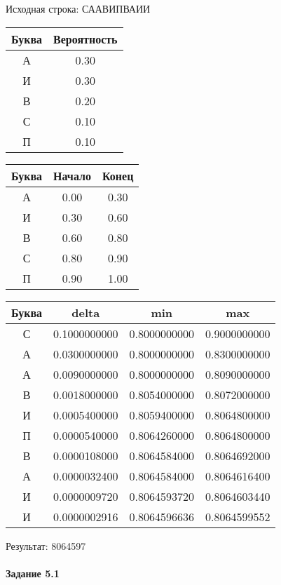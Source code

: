 \documentclass[a4paper, 12pt]{article}
\begin{document}
Исходная строка: СААВИПВАИИ\
\begin{center}
 \begin{tabular}{ |c|c| } 
  \hline
     Буква & Вероятность \\ \hline
А & 0.30\\\hline
И & 0.30\\\hline
В & 0.20\\\hline
С & 0.10\\\hline
П & 0.10
\\ \hline \end{tabular}
\end{center}
\begin{center}
 \begin{tabular}{ |c|c|c| } 
  \hline
     Буква & Начало & Конец \\ \hline
А & 0.00 & 0.30\\\hline
И & 0.30 & 0.60\\\hline
В & 0.60 & 0.80\\\hline
С & 0.80 & 0.90\\\hline
П & 0.90 & 1.00
\\ \hline \end{tabular}
\end{center}
\begin{center}
 \begin{tabular}{ |c|c|c|c| } 
  \hline
     Буква & delta & min & max \\ \hline
С & 0.1000000000 & 0.8000000000 & 0.9000000000\\\hline
А & 0.0300000000 & 0.8000000000 & 0.8300000000\\\hline
А & 0.0090000000 & 0.8000000000 & 0.8090000000\\\hline
В & 0.0018000000 & 0.8054000000 & 0.8072000000\\\hline
И & 0.0005400000 & 0.8059400000 & 0.8064800000\\\hline
П & 0.0000540000 & 0.8064260000 & 0.8064800000\\\hline
В & 0.0000108000 & 0.8064584000 & 0.8064692000\\\hline
А & 0.0000032400 & 0.8064584000 & 0.8064616400\\\hline
И & 0.0000009720 & 0.8064593720 & 0.8064603440\\\hline
И & 0.0000002916 & 0.8064596636 & 0.8064599552
\\ \hline \end{tabular}
\end{center}
Результат: 8064597
\pagebreak
\paragraph{Задание 5.1 \\
}
\end{document}
